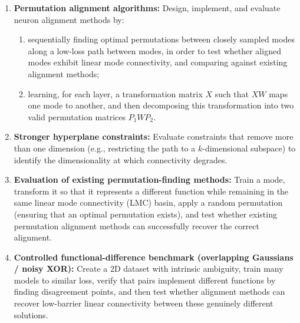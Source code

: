 \documentclass[11pt,a4paper]{article}
\begin{document}
\begin{enumerate}
    \item \textbf{Permutation alignment algorithms:} Design, implement, and evaluate neuron alignment methods by:
    \begin{enumerate}
        \item sequentially finding optimal permutations between closely sampled modes along a low-loss path between modes, in order to test whether aligned modes exhibit linear mode connectivity, and comparing against existing alignment methods;
        \item learning, for each layer, a transformation matrix $X$ such that $XW$ maps one mode to another, and then decomposing this transformation into two valid permutation matrices $P_1 W P_2$.
    \end{enumerate}

    \item \textbf{Stronger hyperplane constraints:} Evaluate constraints that remove more than one dimension (e.g., restricting the path to a $k$-dimensional subspace) to identify the dimensionality at which connectivity degrades.


    \item \textbf{Evaluation of existing permutation-finding methods:} Train a mode, transform it so that it represents a different function while remaining in the same linear mode connectivity (LMC) basin, apply a random permutation (ensuring that an optimal permutation exists), and test whether existing permutation alignment methods can successfully recover the correct alignment.

    \item \textbf{Controlled functional-difference benchmark (overlapping Gaussians / noisy XOR):} Create a 2D dataset with intrinsic ambiguity, train many models to similar loss, verify that pairs implement different functions by finding disagreement points, and then test whether alignment methods can recover low-barrier linear connectivity between these genuinely different solutions.
\end{enumerate}
\end{document}
